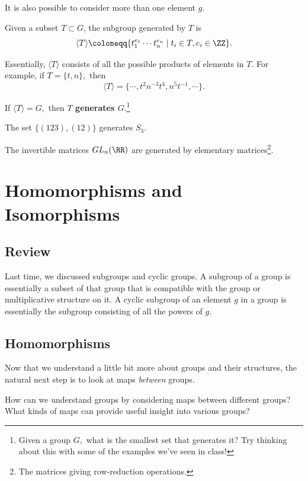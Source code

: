 It is also possible to consider more than one element $g.$ 
\begin{definition}
Given a subset $T \subset G$, the subgroup generated by $T$ is \[\langle T \rangle \coloneqq \{t_1^{e_1}\cdots t_n^{e_n} \mid t_i \in T, e_i \in \ZZ\}.\] 
\end{definition}

Essentially, $\langle T \rangle$ consists of all the possible products of elements in $T.$ For example, if $T = \{t, n\},$ then \[
\langle T \rangle = \{\cdots, t^2n^{-3}t^4, n^5t^{-1}, \cdots \}.
\]
\begin{definition}
If $\langle T \rangle = G,$ then \textbf{$T$ generates $G.$}\footnote{Given a group $G,$ what is the smallest set that generates it? Try thinking about this with some of the examples we've seen in class!}
\end{definition}

\begin{example}
The set $\{(123), (12)\}$ generates $S_3.$ 
\end{example}
\begin{example}
The invertible matrices $GL_n(\RR)$ are generated by elementary matrices\footnote{The matrices giving row-reduction operations.}.
\end{example}

\newpage


\section{Homomorphisms and Isomorphisms}
\subsection{Review}
Last time, we discussed subgroups and cyclic groups. A subgroup of a group is essentially a subset of that group that is compatible with the group or multiplicative structure on it. A cyclic subgroup of an element $g$ in a group is essentially the subgroup consisting of all the powers of $g.$
\subsection{Homomorphisms}
Now that we understand a little bit more about groups and their structures, the natural next step is to look at maps \emph{between} groups.
\begin{qq}
How can we understand groups by considering maps between different groups? What kinds of maps can provide useful insight into various groups?
\end{qq}

